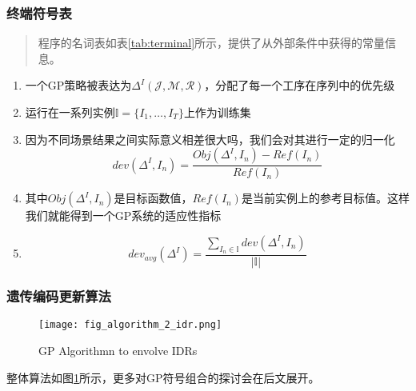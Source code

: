 \begin{frame}
    \frametitle{终端符号表}
    
    \begin{quote}
        程序的名词表如表\ref{tab:terminal}所示，提供了从外部条件中获得的常量信息。
    \end{quote}
\end{frame}

\begin{frame}
    \begin{enumerate}
        \item 一个GP策略被表达为$\Delta^I(\mathcal{J,M,R})$，分配了每一个工序在序列中的优先级
        \item 运行在一系列实例$\mathbb{I}=\{I_1,\dots,I_T\}$上作为训练集
        \item 因为不同场景结果之间实际意义相差很大吗，我们会对其进行一定的归一化
            $$dev(\Delta^I,I_n)=\frac{Obj(\Delta^I,I_n)-Ref(I_n)}{Ref(I_n)}$$
        \item 其中$Obj(\Delta^I,I_n)$是目标函数值，$Ref(I_n)$是当前实例上的参考目标值。这样我们就能得到一个GP系统的适应性指标
        \item $$dev_{avg}(\Delta^I)=\frac{\sum\limits_{I_n\in \mathbb{I}}\limits^{} dev(\Delta^I, I_n)}{|\mathbb{I}|}$$
    \end{enumerate}
\end{frame}

\begin{frame}
    \frametitle{遗传编码更新算法}
    \begin{figure}[H]
        \texttt{[image: fig\_algorithm\_2\_idr.png]}
        \caption{GP Algorithmn to envolve IDRs}
        \label{fig:algorithm_gp_idr}
    \end{figure}
    整体算法如图\ref{fig:algorithm_gp_idr}所示，更多对GP符号组合的探讨会在后文展开。
\end{frame}